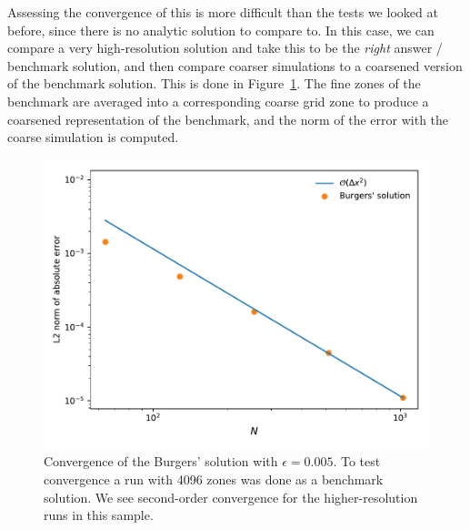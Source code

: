 Assessing the convergence of this is more difficult than the tests we
looked at before, since there is no analytic solution to compare to.
In this case, we can compare a very high-resolution solution and take
this to be the {\em right} answer / benchmark solution, and then
compare coarser simulations to a coarsened version of the benchmark solution.
This is done in Figure~\ref{fig:multiphysics:burgersconverge}.  The
fine zones of the benchmark are averaged into a corresponding coarse grid zone
to produce a coarsened representation of the benchmark, and the norm 
of the error with the coarse simulation is computed.

\begin{figure}[t]
\centering
\includegraphics[width=5.0in]{burgersvisc_converge}
\caption[Convergence of the viscous Burgers' equation]
  {\label{fig:multiphysics:burgersconverge} Convergence of the Burgers'
    solution with $\epsilon = 0.005$.  To test convergence a run with 4096
    zones was done as a benchmark solution.  We see second-order
    convergence for the higher-resolution runs in this sample.\\
   }
\end{figure}
